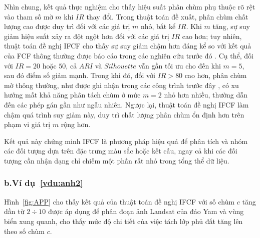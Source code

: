 \documentclass[a4paper,oneside]{book} %
\theoremstyle{plain}
\theoremstyle{plain}
\theoremstyle{nonumberplain}
\begin{document}
Nhìn chung, kết quả thực nghiệm cho thấy hiệu suất phân chùm phụ thuộc rõ rệt vào tham số mờ $m$ khi $IR$ thay đổi. Trong thuật toán đề xuất, phân chùm chất lượng cao được duy trì đối với các giá trị $m$ nhỏ, bất kể $IR$. Khi $m$ tăng, sự suy giảm hiệu suất xảy ra đột ngột hơn đối với các giá trị $IR$ cao hơn; tuy nhiên, thuật toán đề nghị IFCF cho thấy sự suy giảm chậm hơn đáng kể so với kết quả của FCF thông thường được báo cáo trong các nghiên cứu trước đó \cite{nguyentrang2017fuzzy}. Cụ thể, đối với $IR=20$ hoặc $50$, cả $ARI$ và $Silhouette$ vẫn gần tối ưu cho đến khi $m=5$, sau đó điểm số giảm mạnh. Trong khi đó, đối với $IR>80$ cao hơn, phân chùm mờ thông thường, như được ghi nhận trong các công trình trước đây \cite{nguyen2024new,nguyen2024efficient}, có xu hướng mất khả năng phân tách chùm ở mức $m=2$ nhỏ hơn nhiều, thường dẫn đến các phép gán gần như ngẫu nhiên. Ngược lại, thuật toán đề nghị IFCF làm chậm quá trình suy giảm này, duy trì chất lượng phân chùm ổn định hơn trên phạm vi giá trị $m$ rộng hơn.

Kết quả này chứng minh IFCF là phương pháp hiệu quả để phân tích và nhóm các đối tượng dựa trên đặc trưng màu sắc hoặc kết cấu, ngay cả khi các đối tượng cần nhận dạng chỉ chiếm một phần rất nhỏ trong tổng thể dữ liệu.

\subsubsection{b.\quad Ví dụ~\ref{vdu:anh2}}

Hình~\ref{fig:APP} cho thấy kết quả của thuật toán đề nghị IFCF với số chùm $c$ tăng dần từ $2\div 10$ được áp dụng để phân đoạn ảnh Landsat của đảo Yam và vùng biển xung quanh, cho thấy mức độ chi tiết của việc tách lớp phủ đất tăng lên theo số chùm $c$.
\end{document}
